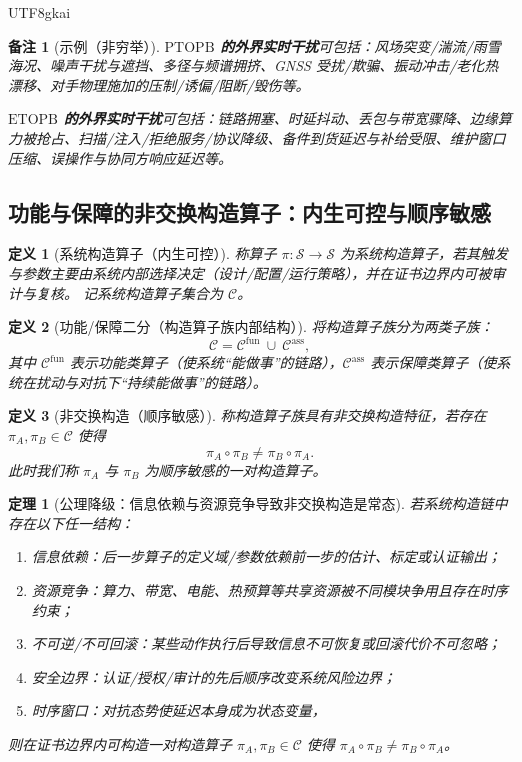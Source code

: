 \documentclass[12pt]{article}
\newtheorem{definition}{定义}[section]
\newtheorem{theorem}{定理}[section]
\newtheorem{remark}{备注}[section]
\newcommand{\PTOPB}{\ensuremath{\mathrm{PTOPB}}}
\newcommand{\ETOPB}{\ensuremath{\mathrm{ETOPB}}}
\begin{document}
\begin{CJK*}{UTF8}{gkai}
\begin{remark}[示例（非穷举）]
\textbf{\PTOPB{} 的外界实时干扰}可包括：风场突变/湍流/雨雪海况、噪声干扰与遮挡、多径与频谱拥挤、GNSS 受扰/欺骗、振动冲击/老化热漂移、对手物理施加的压制/诱偏/阻断/毁伤等。

\textbf{\ETOPB{} 的外界实时干扰}可包括：链路拥塞、时延抖动、丢包与带宽骤降、边缘算力被抢占、扫描/注入/拒绝服务/协议降级、备件到货延迟与补给受限、维护窗口压缩、误操作与协同方响应延迟等。
\end{remark}

\subsection{功能与保障的非交换构造算子：内生可控与顺序敏感}
\label{sec:construction-operators}

\begin{definition}[系统构造算子（内生可控）]
称算子 $\pi:\mathcal{S}\to\mathcal{S}$ 为系统构造算子，若其触发与参数主要由系统内部选择决定（设计/配置/运行策略），并在证书边界内可被审计与复核。
记系统构造算子集合为 $\mathcal{C}$。
\end{definition}

\begin{definition}[功能/保障二分（构造算子族内部结构）]
将构造算子族分为两类子族：
\[
  \mathcal{C} = \mathcal{C}^{\mathrm{fun}}\ \cup\ \mathcal{C}^{\mathrm{ass}},
\]
其中 $\mathcal{C}^{\mathrm{fun}}$ 表示功能类算子（使系统“能做事”的链路），$\mathcal{C}^{\mathrm{ass}}$ 表示保障类算子（使系统在扰动与对抗下“持续能做事”的链路）。
\end{definition}

\begin{definition}[非交换构造（顺序敏感）]
称构造算子族具有非交换构造特征，若存在 $\pi_A,\pi_B\in\mathcal{C}$ 使得
\[
  \pi_A\circ \pi_B \neq \pi_B\circ \pi_A.
\]
此时我们称 $\pi_A$ 与 $\pi_B$ 为顺序敏感的一对构造算子。
\end{definition}

\begin{theorem}[公理降级：信息依赖与资源竞争导致非交换构造是常态]
\label{thm:noncommutativity-is-default}
若系统构造链中存在以下任一结构：
\begin{enumerate}
  \item 信息依赖：后一步算子的定义域/参数依赖前一步的估计、标定或认证输出；
  \item 资源竞争：算力、带宽、电能、热预算等共享资源被不同模块争用且存在时序约束；
  \item 不可逆/不可回滚：某些动作执行后导致信息不可恢复或回滚代价不可忽略；
  \item 安全边界：认证/授权/审计的先后顺序改变系统风险边界；
  \item 时序窗口：对抗态势使延迟本身成为状态变量，
\end{enumerate}
则在证书边界内可构造一对构造算子 $\pi_A,\pi_B\in\mathcal{C}$ 使得 $\pi_A\circ \pi_B \neq \pi_B\circ \pi_A$。
\end{theorem}


\end{CJK*}
\end{document}
